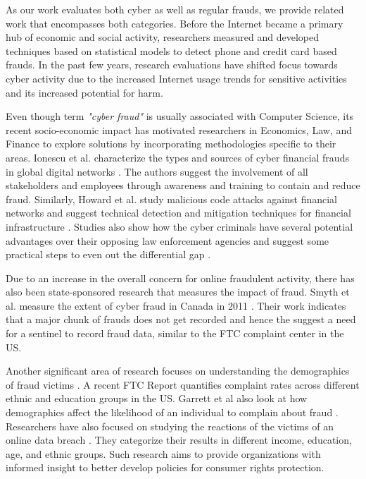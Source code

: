 \documentclass[conference]{IEEEtran}
\begin{document}
As our work evaluates both cyber as well as regular frauds, we provide related work that encompasses both categories. Before the Internet became a primary hub of economic and social activity, researchers measured \cite{clarke2001controlling} and developed techniques based on statistical models \cite{brause1999neural, moreau1997detection, bolton2002statistical} to detect phone and credit card based frauds. In the past few years,  research evaluations have shifted focus towards cyber activity \cite{ablon2016consumer, piper2002, ionescu2011fraud, howard2007cyber, snyder2015no} due to the increased Internet usage trends for sensitive activities and its increased potential for harm.

Even though term \emph{"cyber fraud"} is usually associated with Computer Science, its recent socio-economic impact has motivated researchers in Economics, Law, and Finance to explore solutions by incorporating methodologies specific to their areas. Ionescu et al. characterize the types and sources of cyber financial frauds in global digital networks \cite{ionescu2011fraud}. The authors suggest the involvement of all stakeholders and employees through awareness and training to contain and reduce fraud. Similarly, Howard et al. study malicious code attacks against financial networks and suggest technical detection and mitigation techniques for financial infrastructure \cite{howard2007cyber} . Studies also show how the cyber criminals have several potential advantages over their opposing law enforcement agencies and suggest some practical steps to even out the differential gap \cite{piper2002}.

Due to an increase in the overall concern for online fraudulent activity, there has also been state-sponsored research that measures the impact of fraud. Smyth et al. measure the extent of cyber fraud in Canada in 2011 \cite{smyth2011measuring}. Their work indicates that a major chunk of frauds does not get recorded and hence the suggest a need for a sentinel to record fraud data, similar to the FTC complaint center in the US.

Another significant area of research focuses on understanding the demographics of fraud victims \cite{JOCA:JOCA1}. A recent FTC Report \cite{raval2016determines} quantifies complaint rates across different ethnic and education groups in the US. Garrett et al also look at how demographics affect the likelihood of an individual to complain about fraud \cite{garrett2010consumers}. Researchers have also focused on studying the reactions of the victims of an online data breach \cite{ablon2016consumer}. They categorize their results in different income, education, age, and ethnic groups. Such research aims to provide organizations with informed insight to better develop policies for consumer rights protection.
\end{document}

